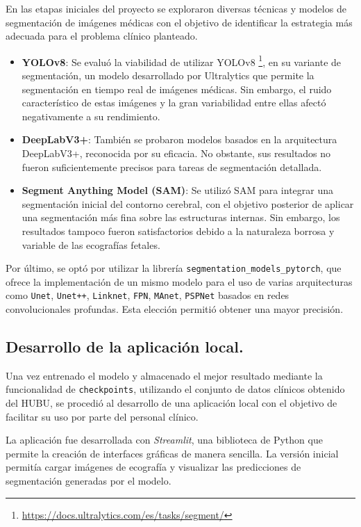 En las etapas iniciales del proyecto se exploraron diversas técnicas y modelos de segmentación de imágenes médicas con el objetivo de identificar la estrategia más adecuada para el problema clínico planteado.
\begin{itemize}
    \item \textbf{YOLOv8}: Se evaluó la viabilidad de utilizar YOLOv8 \footnote{\url{https://docs.ultralytics.com/es/tasks/segment/}}, en su variante de segmentación, un modelo desarrollado por Ultralytics que permite la segmentación en tiempo real de imágenes médicas. Sin embargo, el ruido característico de estas imágenes y la gran variabilidad entre ellas afectó negativamente a su rendimiento.
    \item \textbf{DeepLabV3+}: También se probaron modelos basados en la arquitectura DeepLabV3+, reconocida por su eficacia. No obstante, sus resultados no fueron suficientemente precisos para tareas de segmentación detallada.
    \item \textbf{Segment Anything Model (SAM)}: Se utilizó SAM para integrar una segmentación inicial del contorno cerebral, con el objetivo posterior de aplicar una segmentación más fina sobre las estructuras internas. Sin embargo, los resultados tampoco fueron satisfactorios debido a la naturaleza borrosa y variable de las ecografías fetales.
\end{itemize}
Por último, se optó por utilizar la librería \texttt{segmentation\_models\_pytorch}, que ofrece la implementación de un mismo modelo para el uso de varias arquitecturas como \texttt{Unet}, \texttt{Unet++}, \texttt{Linknet}, \texttt{FPN}, \texttt{MAnet}, \texttt{PSPNet} basados en redes convolucionales profundas. Esta elección permitió obtener una mayor precisión.

\subsection{Desarrollo de la aplicación local.}
Una vez entrenado el modelo y almacenado el mejor resultado mediante la funcionalidad de \texttt{checkpoints}, utilizando el conjunto de datos clínicos obtenido del HUBU, se procedió al desarrollo de una aplicación local con el objetivo de facilitar su uso por parte del personal clínico.

La aplicación fue desarrollada con \textit{Streamlit}, una biblioteca de Python que permite la creación de interfaces gráficas de manera sencilla. La versión inicial permitía cargar imágenes de ecografía y visualizar las predicciones de segmentación generadas por el modelo.

